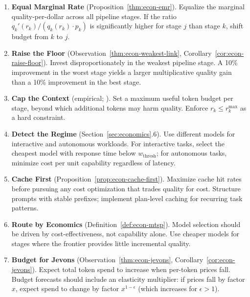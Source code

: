 \documentclass[11pt, a4paper]{googledeepmind}
\begin{document}
\begin{enumerate}[label=\textbf{E\arabic*.}, leftmargin=*, nosep]
    \item \textbf{Equal Marginal Rate} (Proposition~\ref{thm:econ-emr}). Equalize the marginal quality-per-dollar across all pipeline stages. If the ratio $q_k'(r_k)/(q_k(r_k) \cdot p_k)$ is significantly higher for stage $j$ than stage $k$, shift budget from $k$ to $j$.

    \item \textbf{Raise the Floor} (Observation~\ref{thm:econ-weakest-link}, Corollary~\ref{cor:econ-raise-floor}). Invest disproportionately in the weakest pipeline stage. A 10\% improvement in the worst stage yields a larger multiplicative quality gain than a 10\% improvement in the best stage.

    \item \textbf{Cap the Context} (empirical; \citep{gao2025context, liu2024lost, chroma2025rot}). Set a maximum useful token budget per stage, beyond which additional tokens may harm quality. Enforce $r_k \leq r_k^{\max}$ as a hard constraint.

    \item \textbf{Detect the Regime} (Section~\ref{sec:economics}.6). Use different models for interactive and autonomous workloads. For interactive tasks, select the cheapest model with response time below $w_{\text{thresh}}$; for autonomous tasks, minimize cost per unit capability regardless of latency.

    \item \textbf{Cache First} (Proposition~\ref{prop:econ-cache-first}). Maximize cache hit rates before pursuing any cost optimization that trades quality for cost. Structure prompts with stable prefixes; implement plan-level caching for recurring task patterns.

    \item \textbf{Route by Economics} (Definition~\ref{def:econ-mtsp}). Model selection should be driven by cost-effectiveness, not capability alone. Use cheaper models for stages where the frontier provides little incremental quality.

    \item \textbf{Budget for Jevons} (Observation~\ref{thm:econ-jevons}, Corollary~\ref{cor:econ-jevons}). Expect total token spend to increase when per-token prices fall. Budget forecasts should include an elasticity multiplier: if prices fall by factor $x$, expect spend to change by factor $x^{1-\epsilon}$ (which increases for $\epsilon > 1$).
\end{enumerate}
\end{document}
